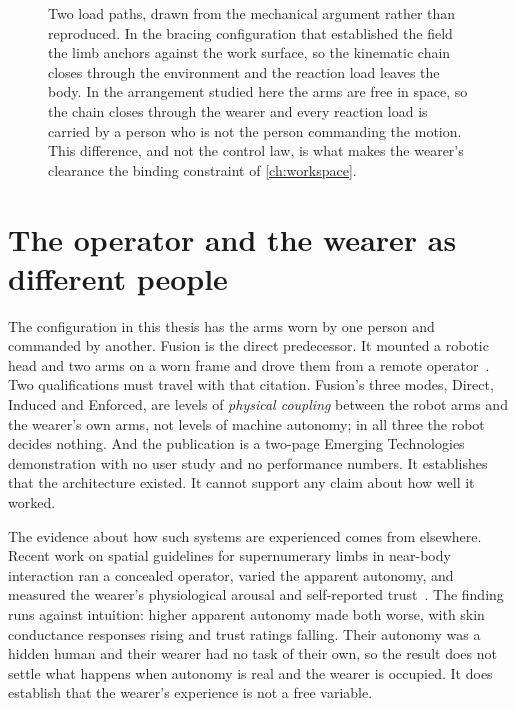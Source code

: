 \begin{figure}[htbp]
  \centering
  
  \caption[Two load paths for a supernumerary limb]{Two load paths, drawn
  from the mechanical argument rather than reproduced. In the bracing
  configuration that established the field~\cite{parietti2014bracing} the
  limb anchors against the work surface, so the kinematic chain closes
  through the environment and the reaction load leaves the body. In the
  arrangement studied here the arms are free in space, so the chain closes
  through the wearer and every reaction load is carried by a person who is
  not the person commanding the motion. This difference, and not the control
  law, is what makes the wearer's clearance the binding constraint of
  \cref{ch:workspace}.}
  \label{fig:bracing}
\end{figure}

\section{The operator and the wearer as different people}

The configuration in this thesis has the arms worn by one person and commanded
by another. Fusion is the direct predecessor. It mounted a robotic head and
two arms on a worn frame and drove them from a remote
operator~\cite{saraiji2018fusion}. Two qualifications must travel with that
citation. Fusion's three modes, Direct, Induced and Enforced, are levels of
\emph{physical coupling} between the robot arms and the wearer's own arms, not
levels of machine autonomy; in all three the robot decides nothing. And the
publication is a two-page Emerging Technologies demonstration with no user
study and no performance numbers. It establishes that the architecture
existed. It cannot support any claim about how well it worked.

The evidence about how such systems are experienced comes from elsewhere.
Recent work on spatial guidelines for supernumerary limbs in near-body
interaction ran a concealed operator, varied the apparent autonomy, and
measured the wearer's physiological arousal and self-reported
trust~\cite{zhou2026proxemics}. The finding runs against intuition: higher
apparent autonomy made both worse, with skin conductance responses rising and
trust ratings falling. Their autonomy was a hidden human and their wearer had
no task of their own, so the result does not settle what happens when autonomy
is real and the wearer is occupied. It does establish that the wearer's
experience is not a free variable.

